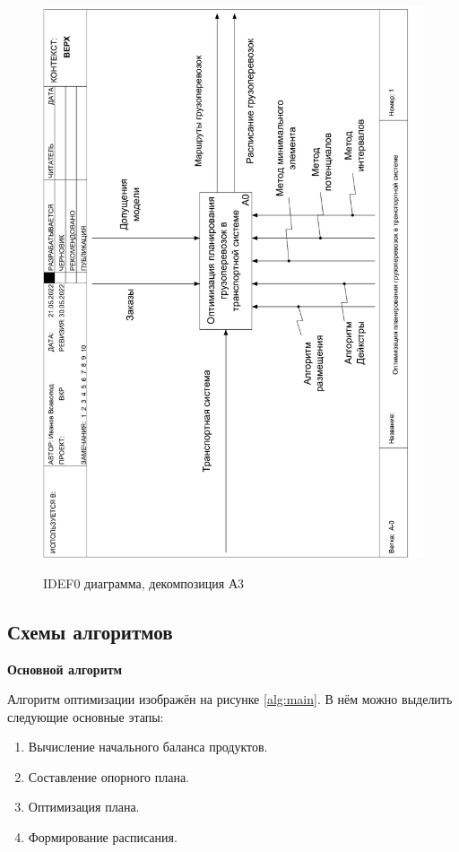 \pagebreak
\begin{figure}[h]
	\begin{center}
		{\includegraphics[scale=0.63, angle=-90, page=6]{img/idef0/idef0.pdf}}
		\caption{IDEF0 диаграмма, декомпозиция А3}
		\label{idef0:A3}
	\end{center}
\end{figure}

\subsection{Схемы алгоритмов}

\textbf{Основной алгоритм}

Алгоритм оптимизации изображён на рисунке \ref{alg:main}. В нём можно выделить следующие основные этапы:
\begin{enumerate}
	\item Вычисление начального баланса продуктов.
	\item Составление опорного плана.
	\item Оптимизация плана.
	\item Формирование расписания.
\end{enumerate}

